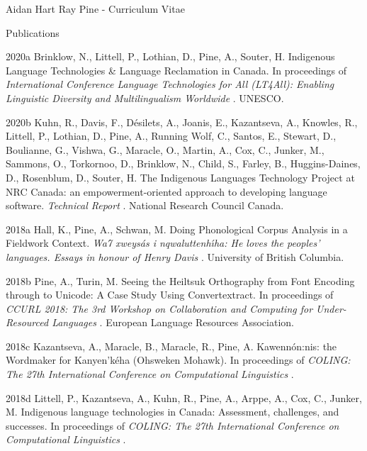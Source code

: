 \documentclass[12pt]{letter}
\begin{document}
\begin{cv}{ Aidan Hart Ray Pine  \space - \space   Curriculum Vitae}
        \begin{cvlist}{Publications}
                                                                        \item[2020a] Brinklow, N., Littell, P., Lothian, D., Pine, A., Souter, H.  Indigenous Language Technologies \& Language Reclamation in Canada. In proceedings of \textit{ International Conference Language Technologies for All (LT4All): Enabling Linguistic Diversity and Multilingualism Worldwide }.  UNESCO.  
                                                                                \item[2020b]  Kuhn,  R.,  Davis,  F.,  D{\'e}silets,  A.,  Joanis,  E.,  Kazantseva,  A.,  Knowles,  R.,  Littell,  P.,  Lothian,  D.,  Pine,  A.,  Running Wolf,  C.,  Santos,  E.,  Stewart,  D.,  Boulianne,  G.,  Vishwa,  G.,  Maracle,  O.,  Martin,  A.,  Cox,  C.,  Junker,  M.,  Sammons,  O.,  Torkornoo,  D.,  Brinklow,  N.,  Child,  S.,  Farley,  B.,  Huggins-Daines,  D.,  Rosenblum,  D.,  Souter,  H.  The Indigenous Languages Technology Project at NRC Canada: an empowerment-oriented approach to developing language software. \textit{ Technical Report }.  National Research Council Canada.  
                                                                                                                                                                            \item[2018a]  Hall,  K.,  Pine,  A.,  Schwan,  M.  Doing Phonological Corpus Analysis in a Fieldwork Context. \textit{ Wa7 xweys{\'a}s i nqwaluttenh{\'\i}ha: He loves the peoples' languages. Essays in honour of Henry Davis }.  University of British Columbia.  
                                                                                \item[2018b] Pine, A., Turin, M.  Seeing the Heiltsuk Orthography from Font Encoding through to Unicode: A Case Study Using Convertextract. In proceedings of \textit{ CCURL 2018: The 3rd Workshop on Collaboration and Computing for Under-Resourced Languages }.  European Language Resources Association.  
                                                                                \item[2018c] Kazantseva, A., Maracle, B., Maracle, R., Pine, A.  Kawenn{\'o}n:nis: the Wordmaker for Kanyen'k{\'e}ha (Ohsweken Mohawk). In proceedings of \textit{ COLING: The 27th International Conference on Computational Linguistics }.  
                                                                                \item[2018d] Littell, P., Kazantseva, A., Kuhn, R., Pine, A., Arppe, A., Cox, C., Junker, M.  Indigenous language technologies in Canada: Assessment, challenges, and successes. In proceedings of \textit{ COLING: The 27th International Conference on Computational Linguistics }.  

\end{cvlist}
\end{cv}
\end{document}

